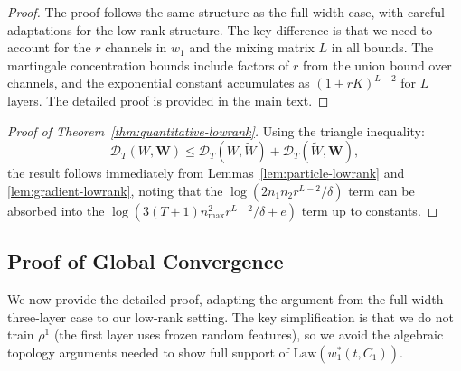 \documentclass[11pt]{article}
\newcommand{\1}{\mathbbm{1}}
\begin{document}
\begin{proof}
The proof follows the same structure as the full-width case, with careful adaptations for the low-rank structure. The key difference is that we need to account for the $r$ channels in $w_1$ and the mixing matrix $L$ in all bounds. The martingale concentration bounds include factors of $r$ from the union bound over channels, and the exponential constant accumulates as $(1+rK)^{L-2}$ for $L$ layers. The detailed proof is provided in the main text.
\end{proof}

\begin{proof}[Proof of Theorem~\ref{thm:quantitative-lowrank}]
Using the triangle inequality:
\[
\mathscr{D}_T(W, \mathbf{W}) \le \mathscr{D}_T(W, \tilde{W}) + \mathscr{D}_T(\tilde{W}, \mathbf{W}),
\]
the result follows immediately from Lemmas~\ref{lem:particle-lowrank} and \ref{lem:gradient-lowrank}, noting that the $\log(2n_1n_2r^{L-2}/\delta)$ term can be absorbed into the $\log(3(T+1)n_{\max}^2r^{L-2}/\delta + e)$ term up to constants.
\end{proof}

\subsection{Proof of Global Convergence}
\label{app:global-convergence-proof}

We now provide the detailed proof, adapting the argument from the full-width three-layer case to our low-rank setting. The key simplification is that we do not train $\rho^1$ (the first layer uses frozen random features), so we avoid the algebraic topology arguments needed to show full support of $\text{Law}(w_1^*(t,C_1))$.
\end{document}
